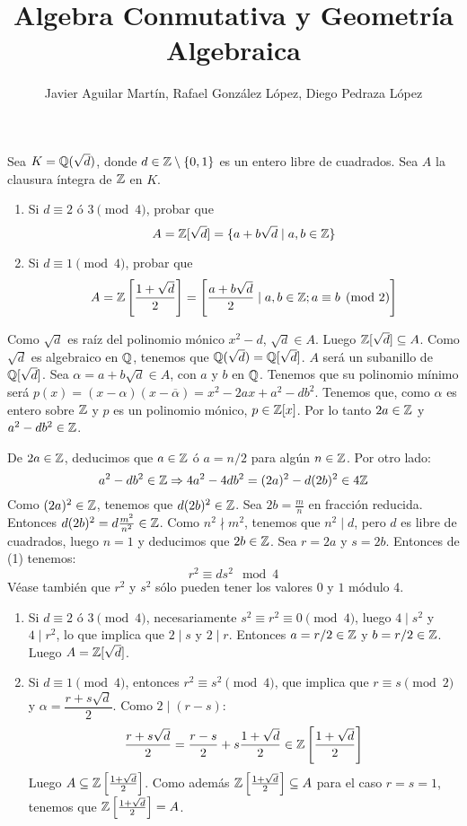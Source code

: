 \documentclass[twoside]{article}
\begin{document}
\title{Algebra Conmutativa y Geometría Algebraica}
\author{Javier Aguilar Martín, Rafael González López, Diego Pedraza López}
\maketitle

\begin{ejercicio}{2}
Sea $K = \mathbb{Q}(\sqrt{d})$, donde $d \in \mathbb{Z}\setminus\{0,1\}$ es un entero libre de cuadrados. Sea $A$ la clausura íntegra de $\mathbb{Z}$ en $K$.
\begin{enumerate}
	\item Si $d \equiv 2$ ó $3 \pmod 4$, probar que
	\[ A = \mathbb{Z}[\sqrt{d}] = \{a + b \sqrt{d} \mid a,b \in \mathbb{Z}\} \]
	
	\item Si $d \equiv 1 \pmod 4$, probar que
	\[ A = \mathbb{Z} \left[\frac{1+\sqrt{d}}{2}\right] = \left[\frac{a+b\sqrt{d}}{2} \mid a,b \in \mathbb{Z}; a \equiv b \pmod 2\right]\]
\end{enumerate}
\end{ejercicio}
\begin{solucion}
Como $\sqrt{d}$ es raíz del polinomio mónico $x^2-d$, $\sqrt{d} \in A$. Luego $\mathbb{Z}[\sqrt{d}] \subseteq A$. Como $\sqrt{d}$ es algebraico en $\mathbb{Q}$, tenemos que $\mathbb{Q}(\sqrt{d})=\mathbb{Q}[\sqrt{d}]$. $A$ será un subanillo de $\mathbb{Q}[\sqrt{d}]$. Sea $α=a+b\sqrt{d} \in A$, con $a$ y $b$ en $\mathbb{Q}$. Tenemos que su polinomio mínimo será $p(x)=(x-α)(x-\overline{α})=x^2-2ax+a^2-db^2$. Tenemos que, como $α$ es entero sobre $\mathbb{Z}$ y $p$ es un polinomio mónico, $p \in \mathbb{Z}[x]$. Por lo tanto $2a \in \mathbb{Z}$ y $a^2-db^2 \in \mathbb{Z}$.

De $2a \in \mathbb{Z}$, deducimos que $a \in \mathbb{Z}$ ó $a = n/2$ para algún $n \in \mathbb{Z}$. Por otro lado:
\begin{equation} a^2-db^2 \in \mathbb{Z} \Rightarrow 4a^2-4db^2=(2a)^2-d(2b)^2 \in 4\mathbb{Z} \end{equation}
Como $(2a)^2 \in \mathbb{Z}$, tenemos que $d(2b)^2 \in \mathbb{Z}$. Sea $2b=\frac{m}{n}$ en fracción reducida. Entonces $d(2b)^2=d\frac{m^2}{n^2} \in \mathbb{Z}$. Como $n^2 \nmid m^2$, tenemos que $n^2 \mid d$, pero $d$ es libre de cuadrados, luego $n=1$ y deducimos que $2b \in \mathbb{Z}$. Sea $r=2a$ y $s=2b$. Entonces de (1) tenemos:
\[ r^2 \equiv d s^2 \mod 4 \]
Véase también que $r^2$ y $s^2$ sólo pueden tener los valores $0$ y $1$ módulo 4.
\begin{enumerate}
	\item Si $d \equiv 2$ ó $3 \pmod 4$, necesariamente $s^2 \equiv r^2 \equiv 0 \pmod 4$, luego $4\mid s^2$ y $4\mid r^2$, lo que implica que $2\mid s$ y $2\mid r$. Entonces $a=r/2 \in \mathbb{Z}$ y $b=r/2 \in \mathbb{Z}$. Luego $A = \mathbb{Z}[\sqrt{d}]$.
	
	\item Si $d \equiv 1 \pmod 4$, entonces $r^2 \equiv s^2 \pmod 4$, que implica que $r \equiv s \pmod 2$ y $α = \dfrac{r+s\sqrt{d}}{2}$. Como $2 \mid (r-s)$:
	\[ \frac{r+s\sqrt{d}}{2} = \frac{r-s}{2}+s\frac{1+\sqrt{d}}{2} \in \mathbb{Z}\left[\frac{1+\sqrt{d}}{2}\right] \]
	Luego $A \subseteq \mathbb{Z}\left[\frac{1+\sqrt{d}}{2}\right]$. Como además $\mathbb{Z}\left[\frac{1+\sqrt{d}}{2}\right] \subseteq A$ para el caso $r=s=1$, tenemos que $\mathbb{Z}\left[\frac{1+\sqrt{d}}{2}\right] = A$.
\end{enumerate}
\end{solucion}
\end{document}
